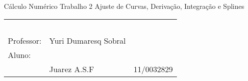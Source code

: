 \documentclass[a4paper,11pt]{article}
\begin{document}
\MakeMyTitlePage
{Cálculo Numérico}
{Trabalho 2}
{Ajuste de Curvas, Derivação, Integração e Splines}
{%
		\begin{tabular}{llr} \
		& & \\[0.05cm]		
		Professor: & Yuri Dumaresq Sobral & \\
		
		Aluno:& & \\
		& Juarez A.S.F 					& 11/0032829\\

		\end{tabular}
}











\end{document}
